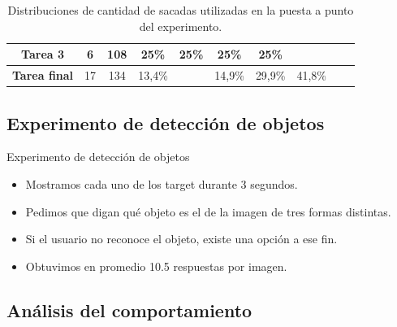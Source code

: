 \documentclass[compress]{beamer}
\begin{document}
\begin{frame}
\begin{table}[h]
\begin{tabular}{c|c|c|c|c|c|c|c|c|c|}
\multicolumn{1}{|c|}{\textbf{Tarea 3}}     & 6                                                                                        & 108                                                                                                  & 25\%       & 25\%       & 25\%       & 25\%       &             &             &             \\ \hline
\multicolumn{1}{|c|}{\textbf{Tarea final}} & 17                                                                                       & 134                                                                                                  & 13,4\%    &            & 14,9\%    & 29,9\%    & 41,8\%     &             &             \\ \hline
\end{tabular}
\caption{\label{tab:tareas} Distribuciones de cantidad de sacadas utilizadas en la puesta a punto del experimento.}
\end{table}


\end{frame}

\subsection{Experimento de detección de objetos}
\begin{frame}{Experimento de detección de objetos}
\begin{itemize}
\item Mostramos cada uno de los target durante 3 segundos.
\item Pedimos que digan qué objeto es el de la imagen de tres formas distintas.
\item Si el usuario no reconoce el objeto, existe una opción a ese fin.
\item Obtuvimos en promedio 10.5 respuestas por imagen.
\end{itemize}
\end{frame}

\subsection{Análisis del comportamiento}
\end{document}
